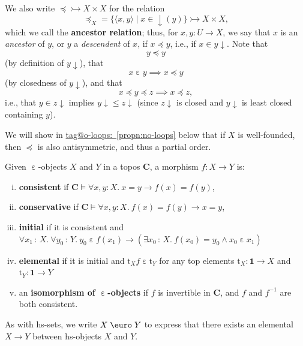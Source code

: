 \documentclass{amsart}
\makeatletter
\newcommand\bC{\mathbf{C}}
\newcommand\br[1]{\langle{}#1\rangle{}}
\newcommand\defword[1]{{\boldmath \textbf{#1}}}
\newcommand\dwnfn{{\downarrow}}
\newcommand\dwn{\mathpunct{\downarrow}}
\newcommand\Ein{\mathrel{\text{\textup{\euro}}}}
\newcommand\ein{\mathrel{\varepsilon}}
\newcommand\I{^{-1}}
\newcommand\rt{\mathrm{t}}
\newcommand\set[2][]{#1\{ #2 #1\}}
\newcommand\tm{\mathbf{1}}
\newcommand\tolon{{\,:\,}}
\newcommand\tto{\rightarrowtail}
\newcommand\unein{{\ein}}
\newcommand\tagword[1]{\csname tag@#1\endcsname}
\def\label@tag#1:#2\@nil{#1}
\newcommand\labeltag[1]{\label@tag#1:\@nil}
\newcommand\jref[1]{%
  \texorpdfstring%
    {\hyperref[#1]{\tagword{\labeltag{#1}}~\ref*{#1}}}%
    {\tagword{\labeltag{#1}}~\ref*{#1}}%
}
\theoremstyle{definition}
\theoremstyle{remark}
\theoremstyle{plainwithref}
\makeatother
\begin{document}
\begin{defn}
  We also write \( {\preceq} \tto X \times X \) for the relation
  \[
    {\preceq}_X = \set{\br{x,y} \mid x \in \dwnfn(y)} \tto X \times X,
  \]
  which we call the \defword{ancestor relation}; thus, for \( x,y \colon U \to X \), we say that \( x \) is an \emph{ancestor} of \( y \), or \( y \) a \emph{descendent} of \( x \), if \( x \preceq y \), i.e., if \( x \in y \dwn \).
  Note that
  \[
    y \preceq y
  \]
  (by definition of \( y \dwn \)), that
  \[
    x \ein y \implies x \preceq y
  \]
  (by closedness of \( y \dwn \)), and that
  \[
    x \preceq y \preceq z \implies x \preceq z,
  \]
  i.e., that \( y \in z \dwn \) implies \( y \dwn \le z \dwn \) (since \( z \dwn \) is closed and \( y \dwn \) is least closed containing \( y \)).

  We will show in \jref{propn:no-loops} below that if \( X \) is well-founded, then \( \preceq \) is also antisymmetric, and thus a partial order.
\end{defn}

\begin{defn} \label{defn:ein-hs-mor}
  Given \( \unein \)-objects \( X \) and \( Y \) in a topos \( \bC \), a morphism \( f \colon X \to Y \) is:
  \begin{enumerate}[(i)]
  \item \defword{consistent} if
    \( \bC \vDash \forall x,y \colon X.\ x = y \to f(x) = f(y) \),
  \item \defword{conservative} if
    \( \bC \vDash \forall x,y \colon X.\ f(x) = f(y) \to x = y \),
  \item \defword{initial} if it is consistent %
    and
    \( \forall x_1 \tolon X.\ \forall y_0 \tolon Y.\ y_0 \ein f(x_1) \to
    (\exists x_0 \tolon X.\ f(x_0) = y_0 \wedge x_0 \ein x_1)  \)
  \item \defword{elemental} if it is initial and \( \rt_X f \ein \rt_Y \) for any\footnotemark{} top elements \( \rt_X \colon \tm \to X \) and \( \rt_Y \colon \tm \to Y \)
  \item an \defword{isomorphism of \( \unein \)-objects} if \( f \) is invertible in \( \bC \), and \( f \) and \( f\I \) are both consistent.
  \end{enumerate}

  As with hs-sets, we write \( X \Ein Y \) to express that there exists an elemental \( X \to Y \) between hs-objects \( X \) and \( Y \).
\end{defn}
\end{document}
